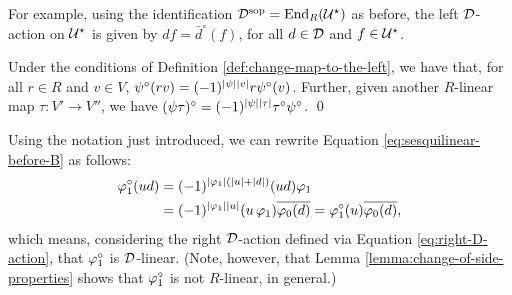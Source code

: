 \documentclass{amsbook}
\begin{document}
For example, using the identification $\mathcal{D}^{\mathrm{sop}} = \operatorname{End}_R (\mathcal U^\star)$ as before, the left $\mathcal{D}$-action on $\mathcal U^\star$ is given by $df = \bar d^\circ (f)$, for all $d\in \mathcal{D}$ and $f\in \mathcal U^\star$.

\begin{lemma}\label{lemma:change-of-side-properties}
    Under the conditions of Definition \ref{def:change-map-to-the-left}, we have that, for all $r\in R$ and $v\in V$,  $\psi^\circ (rv) = (-1)^{|\psi||v|} r \psi^\circ (v)$. 
    Further, given another $R$-linear map $\tau: V' \to V''$, we have $(\psi\tau)^\circ = (-1)^{|\psi||\tau|} \tau^\circ\psi^\circ$. \qed
\end{lemma}




Using the notation just introduced, we can rewrite Equation \eqref{eq:sesquilinear-before-B} as follows:
%
\begin{equation}\label{eq:vphi1-circ-is-D-linear}
    \begin{split}
        \varphi_1^\circ (ud) &= (-1)^{|\varphi_1|(|u|+|d|)} (ud)\varphi_1 \\
        &=(-1)^{|\varphi_1||u|}(u\,\varphi_1) \overline{\varphi_0(d)} = 
        \varphi_1^\circ (u) \overline{\varphi_0(d)},
    \end{split}
\end{equation}
%
which means, considering the right $\mathcal{D}$-action defined via Equation \eqref{eq:right-D-action},
that $\varphi_1^\circ$ is $\mathcal{D}$-linear. (Note, however, that Lemma \ref{lemma:change-of-side-properties} shows that $\varphi_1^\circ$ is not $R$-linear, in general.)
\end{document}
